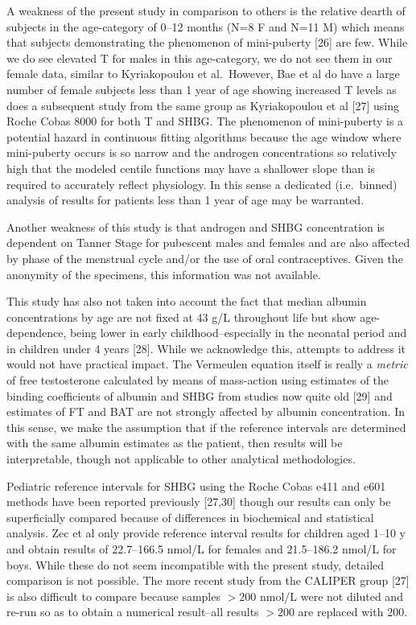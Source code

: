 \documentclass[]{elsarticle} %
\begin{document}
A weakness of the present study in comparison to others is the relative
dearth of subjects in the age-category of 0--12 months (N=8 F and N=11
M) which means that subjects demonstrating the phenomenon of
mini-puberty {[}26{]} are few. While we do see elevated T for males in
this age-category, we do not see them in our female data, similar to
Kyriakopoulou et al.~However, Bae et al do have a large number of female
subjects less than 1 year of age showing increased T levels as does a
subsequent study from the same group as Kyriakopoulou et al {[}27{]}
using Roche Cobas 8000 for both T and SHBG. The phenomenon of
mini-puberty is a potential hazard in continuous fitting algorithms
because the age window where mini-puberty occurs is so narrow and the
androgen concentrations so relatively high that the modeled centile
functions may have a shallower slope than is required to accurately
reflect physiology. In this sense a dedicated (i.e.~binned) analysis of
results for patients less than 1 year of age may be warranted.

Another weakness of this study is that androgen and SHBG concentration
is dependent on Tanner Stage for pubescent males and females and are
also affected by phase of the menstrual cycle and/or the use of oral
contraceptives. Given the anonymity of the specimens, this information
was not available.

This study has also not taken into account the fact that median albumin
concentrations by age are not fixed at 43 g/L throughout life but show
age-dependence, being lower in early childhood--especially in the
neonatal period and in children under 4 years {[}28{]}. While we
acknowledge this, attempts to address it would not have practical
impact. The Vermeulen equation itself is really a \emph{metric} of free
testosterone calculated by means of mass-action using estimates of the
binding coefficients of albumin and SHBG from studies now quite old
{[}29{]} and estimates of FT and BAT are not strongly affected by
albumin concentration. In this sense, we make the assumption that if the
reference intervals are determined with the same albumin estimates as
the patient, then results will be interpretable, though not applicable
to other analytical methodologies.

Pediatric reference intervals for SHBG using the Roche Cobas e411 and
e601 methods have been reported previously {[}27,30{]} though our
results can only be superficially compared because of differences in
biochemical and statistical analysis. Zec et al only provide reference
interval results for children aged 1--10 y and obtain results of
22.7--166.5 nmol/L for females and 21.5--186.2 nmol/L for boys. While
these do not seem incompatible with the present study, detailed
comparison is not possible. The more recent study from the CALIPER group
{[}27{]} is also difficult to compare because samples \(>200\) nmol/L
were not diluted and re-run so as to obtain a numerical result--all
results \(>200\) are replaced with 200.
\end{document}
